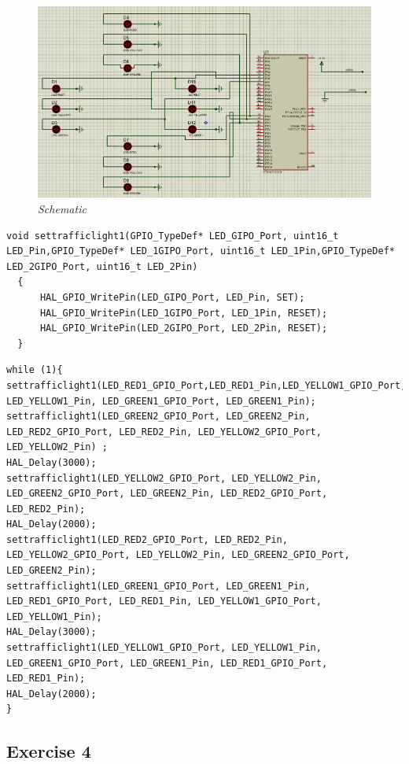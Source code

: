 \begin{figure}[!htp]
    \centering
    \includegraphics[width=5in]{source/picture/bai_1/pic3.jpg}
    \caption{\textit{Schematic}}
    \label{bai1_pic2}
\end{figure}
\begin{lstlisting}[caption= Ex3.c]
void settrafficlight1(GPIO_TypeDef* LED_GIPO_Port, uint16_t LED_Pin,GPIO_TypeDef* LED_1GIPO_Port, uint16_t LED_1Pin,GPIO_TypeDef* LED_2GIPO_Port, uint16_t LED_2Pin)
  {
	  HAL_GPIO_WritePin(LED_GIPO_Port, LED_Pin, SET);
	  HAL_GPIO_WritePin(LED_1GIPO_Port, LED_1Pin, RESET);
	  HAL_GPIO_WritePin(LED_2GIPO_Port, LED_2Pin, RESET);
  }
\end{lstlisting}

\begin{lstlisting}[caption= main.c]
while (1){
settrafficlight1(LED_RED1_GPIO_Port,LED_RED1_Pin,LED_YELLOW1_GPIO_Port, LED_YELLOW1_Pin, LED_GREEN1_GPIO_Port, LED_GREEN1_Pin);
settrafficlight1(LED_GREEN2_GPIO_Port, LED_GREEN2_Pin, LED_RED2_GPIO_Port, LED_RED2_Pin, LED_YELLOW2_GPIO_Port, LED_YELLOW2_Pin) ;
HAL_Delay(3000);
settrafficlight1(LED_YELLOW2_GPIO_Port, LED_YELLOW2_Pin, LED_GREEN2_GPIO_Port, LED_GREEN2_Pin, LED_RED2_GPIO_Port, LED_RED2_Pin);
HAL_Delay(2000);
settrafficlight1(LED_RED2_GPIO_Port, LED_RED2_Pin, LED_YELLOW2_GPIO_Port, LED_YELLOW2_Pin, LED_GREEN2_GPIO_Port, LED_GREEN2_Pin);
settrafficlight1(LED_GREEN1_GPIO_Port, LED_GREEN1_Pin, LED_RED1_GPIO_Port, LED_RED1_Pin, LED_YELLOW1_GPIO_Port, LED_YELLOW1_Pin);
HAL_Delay(3000);
settrafficlight1(LED_YELLOW1_GPIO_Port, LED_YELLOW1_Pin, LED_GREEN1_GPIO_Port, LED_GREEN1_Pin, LED_RED1_GPIO_Port, LED_RED1_Pin);
HAL_Delay(2000);
}
\end{lstlisting}

\subsection{Exercise 4}


